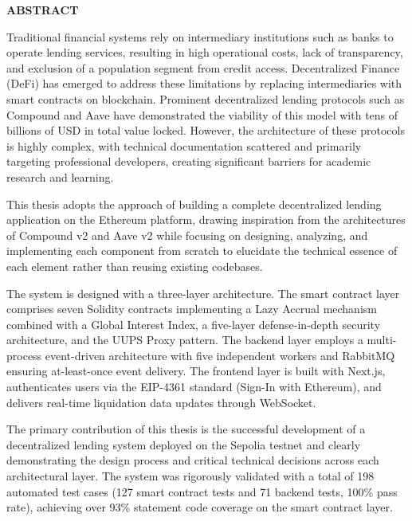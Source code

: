 \documentclass[../DoAn.tex]{subfiles}
\begin{document}
\begin{center}
    \Large{\textbf{ABSTRACT}}\\
\end{center}
\vspace{1cm}
Traditional financial systems rely on intermediary institutions such as banks to operate lending services, resulting in high operational costs, lack of transparency, and exclusion of a population segment from credit access. Decentralized Finance (DeFi) has emerged to address these limitations by replacing intermediaries with smart contracts on blockchain. Prominent decentralized lending protocols such as Compound and Aave have demonstrated the viability of this model with tens of billions of USD in total value locked. However, the architecture of these protocols is highly complex, with technical documentation scattered and primarily targeting professional developers, creating significant barriers for academic research and learning.

This thesis adopts the approach of building a complete decentralized lending application on the Ethereum platform, drawing inspiration from the architectures of Compound v2 and Aave v2 while focusing on designing, analyzing, and implementing each component from scratch to elucidate the technical essence of each element rather than reusing existing codebases.

The system is designed with a three-layer architecture. The smart contract layer comprises seven Solidity contracts implementing a Lazy Accrual mechanism combined with a Global Interest Index, a five-layer defense-in-depth security architecture, and the UUPS Proxy pattern. The backend layer employs a multi-process event-driven architecture with five independent workers and RabbitMQ ensuring at-least-once event delivery. The frontend layer is built with Next.js, authenticates users via the EIP-4361 standard (Sign-In with Ethereum), and delivers real-time liquidation data updates through WebSocket.

The primary contribution of this thesis is the successful development of a decentralized lending system deployed on the Sepolia testnet and clearly demonstrating the design process and critical technical decisions across each architectural layer. The system was rigorously validated with a total of 198 automated test cases (127 smart contract tests and 71 backend tests, 100\% pass rate), achieving over 93\% statement code coverage on the smart contract layer.
\end{document}
